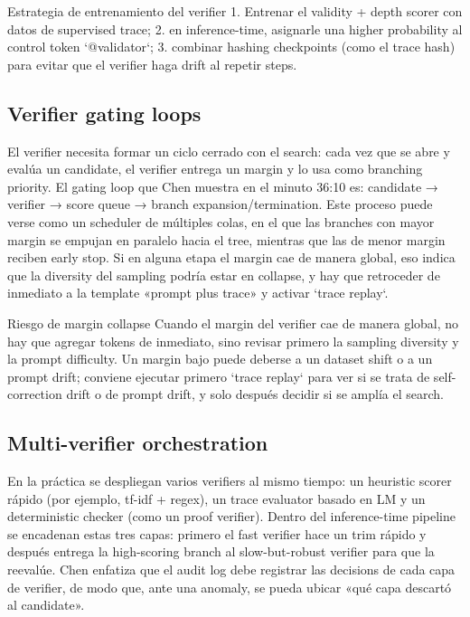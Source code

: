 \documentclass[a4paper]{article}
\begin{document}
\begin{knowledgebox}{Estrategia de entrenamiento del verifier}
1. Entrenar el validity + depth scorer con datos de supervised trace; 2. en inference-time, asignarle una higher probability al control token `{@validator}`; 3. combinar hashing checkpoints (como el trace hash) para evitar que el verifier haga drift al repetir steps.
\end{knowledgebox}

\subsection{Verifier gating loops}
El verifier necesita formar un ciclo cerrado con el search: cada vez que se abre y evalúa un candidate, el verifier entrega un margin y lo usa como branching priority. El gating loop que Chen muestra en el minuto 36:10 es: candidate → verifier → score queue → branch expansion/termination. Este proceso puede verse como un scheduler de múltiples colas, en el que las branches con mayor margin se empujan en paralelo hacia el tree, mientras que las de menor margin reciben early stop. Si en alguna etapa el margin cae de manera global, eso indica que la diversity del sampling podría estar en collapse, y hay que retroceder de inmediato a la template «prompt plus trace» y activar `trace replay`.

\begin{warningbox}{Riesgo de margin collapse}
Cuando el margin del verifier cae de manera global, no hay que agregar tokens de inmediato, sino revisar primero la sampling diversity y la prompt difficulty. Un margin bajo puede deberse a un dataset shift o a un prompt drift; conviene ejecutar primero `trace replay` para ver si se trata de self-correction drift o de prompt drift, y solo después decidir si se amplía el search.
\end{warningbox}

\subsection{Multi-verifier orchestration}
En la práctica se despliegan varios verifiers al mismo tiempo: un heuristic scorer rápido (por ejemplo, tf-idf + regex), un trace evaluator basado en LM y un deterministic checker (como un proof verifier). Dentro del inference-time pipeline se encadenan estas tres capas: primero el fast verifier hace un trim rápido y después entrega la high-scoring branch al slow-but-robust verifier para que la reevalúe. Chen enfatiza que el audit log debe registrar las decisions de cada capa de verifier, de modo que, ante una anomaly, se pueda ubicar «qué capa descartó al candidate».
\end{document}

